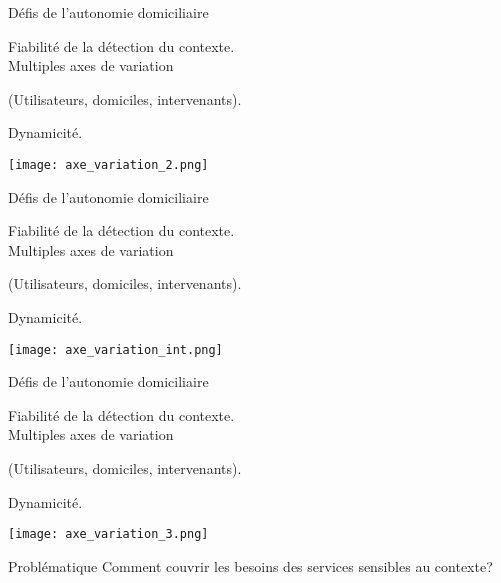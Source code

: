\begin{frame}{Défis de l'autonomie domiciliaire}
  \addtocounter{framenumber}{-1}
\vspace*{-6.3mm}
\begin{minipage}{.4\linewidth}
\small
Fiabilité de la détection du contexte. 
\\
Multiples axes de variation 
\begin{scriptsize}
(Utilisateurs, domiciles, intervenants).
\end{scriptsize}

Dynamicité.
\end{minipage}
\hfill
\begin{minipage}{.5\linewidth}
    \texttt{[image: axe\_variation\_2.png]}
\end{minipage}
\vfill
\end{frame}

\begin{frame}{Défis de l'autonomie domiciliaire}
  \addtocounter{framenumber}{-1}
\vspace*{-6.3mm}
\begin{minipage}{.4\linewidth}
\small
Fiabilité de la détection du contexte. 
\\
Multiples axes de variation 
\begin{scriptsize}
(Utilisateurs, domiciles, intervenants).
\end{scriptsize}

Dynamicité.
\end{minipage}
\hfill
\begin{minipage}{.5\linewidth}
    \texttt{[image: axe\_variation\_int.png]}
\end{minipage}
\vfill
\end{frame}

\begin{frame}{Défis de l'autonomie domiciliaire}
  \addtocounter{framenumber}{-1}
\begin{minipage}{.4\linewidth}
\small
Fiabilité de la détection du contexte. 
\\
Multiples axes de variation 
\begin{scriptsize}
(Utilisateurs, domiciles, intervenants).
\end{scriptsize}

Dynamicité.
\end{minipage}
\hfill
\begin{minipage}{.5\linewidth}
    \texttt{[image: axe\_variation\_3.png]}
\end{minipage}
%
  \begin{coloredbox}[red]{Problématique}
\centering
   Comment couvrir les besoins des services sensibles au contexte?
  \end{coloredbox}
\end{frame}